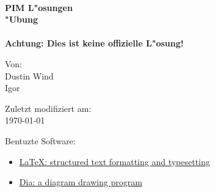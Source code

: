 
\begin{titlepage}
    \begin{center}

    \HRule \\[0.4cm]
    { \huge \bfseries PIM L"osungen\\"Ubung\\[0.4cm] }
    \HRule \\[1.5cm]

    \textbf{Achtung: Dies ist keine offizielle L"osung!}

    \vfill
    Von:\\
    Dustin Wind\\
    Igor


   \vfill
    Zuletzt modifiziert am:\\
    {\large \today}\\
    \end{center}
    \bigskip

    {\small
    Bentuzte Software:
    \begin{itemize}
        \item \href{http://www.latex-project.org}{\LaTeX{}: structured text formatting and typesetting}
        \item \href{https://wiki.gnome.org/Apps/Dia/}{Dia: a diagram drawing program}
    \end{itemize}
    }

\end{titlepage}

